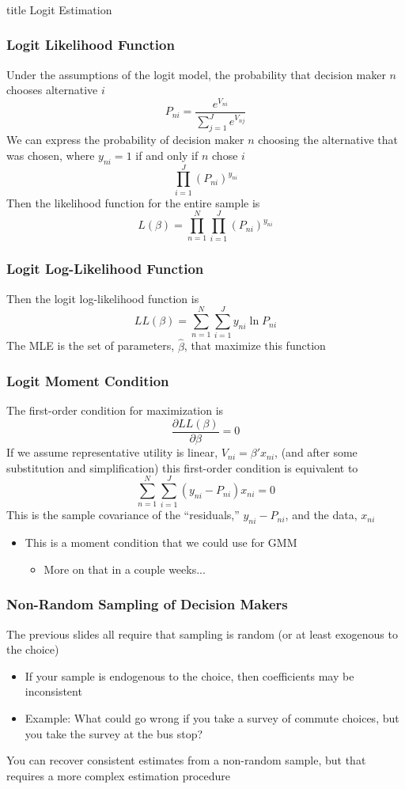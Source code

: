 \documentclass{beamer}
\begin{document}
\begin{frame}\frametitle{}
    \vfill
    \centering
    \begin{beamercolorbox}[center]{title}
        \Large Logit Estimation
    \end{beamercolorbox}
    \vfill
\end{frame}

\begin{frame}\frametitle{Logit Likelihood Function}
    Under the assumptions of the logit model, the probability that decision maker $n$ chooses alternative $i$
    $$P_{ni} = \frac{e^{V_{ni}}}{\sum_{j = 1}^J e^{V_{nj}}}$$
    We can express the probability of decision maker $n$ choosing the alternative that was chosen, where $y_{ni} = 1$ if and only if $n$ chose $i$ 
    $$\prod_{i = 1}^J (P_{ni})^{y_{ni}}$$
    Then the likelihood function for the entire sample is
    $$L(\beta) = \prod_{n = 1}^N \prod_{i = 1}^J (P_{ni})^{y_{ni}}$$
\end{frame}

\begin{frame}\frametitle{Logit Log-Likelihood Function}
    Then the logit log-likelihood function is
    $$LL(\beta) = \sum_{n = 1}^N \sum_{i = 1}^J y_{ni} \ln P_{ni}$$
    The MLE is the set of parameters, $\hat{\beta}$, that maximize this function
\end{frame}

\begin{frame}\frametitle{Logit Moment Condition}
    The first-order condition for maximization is
    $$\frac{\partial LL(\beta)}{\partial \beta} = 0$$
    If we assume representative utility is linear, $V_{ni} = \beta' x_{ni}$, (and after some substitution and simplification) this first-order condition is equivalent to
    $$\sum_{n = 1}^N \sum_{i = 1}^J (y_{ni} - P_{ni}) x_{ni} = 0$$
    This is the sample covariance of the ``residuals,'' $y_{ni} - P_{ni}$, and the data, $x_{ni}$
    \begin{itemize}
    	\item This is a moment condition that we could use for GMM
    	\begin{itemize}
    		\item More on that in a couple weeks...
    	\end{itemize}
    \end{itemize}
\end{frame}

\begin{frame}\frametitle{Non-Random Sampling of Decision Makers}
    The previous slides all require that sampling is random (or at least exogenous to the choice)
    \begin{itemize}
    	\item If your sample is endogenous to the choice, then coefficients may be inconsistent
    	\item Example: What could go wrong if you take a survey of commute choices, but you take the survey at the bus stop?
    \end{itemize}
    \vspace{3ex}
    You can recover consistent estimates from a non-random sample, but that requires a more complex estimation procedure
\end{frame}
\end{document}
